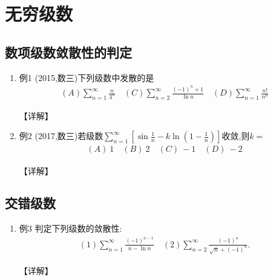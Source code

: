 \documentclass[12pt, a4paper, oneside, UTF8]{ctexbook}
\begin{document}

\else
\fi

\chapter{无穷级数}
\section{数项级数敛散性的判定}

\begin{enumerate}[label=\arabic*.]
    \item 例1 (2015,数三)下列级数中发散的是
    \begin{align*}
        (A)\sum_{n=1}^{\infty}\frac{n}{3^n} \quad (C)\sum_{n=2}^{\infty}\frac{(-1)^n+1}{\ln n} \quad (D)\sum_{n=1}^{\infty}\frac{n!}{n^n}
    \end{align*}
    
    \begin{solution}
    【详解】
    \end{solution}
    
    \item 例2 (2017,数三)若级数$\sum_{n=1}^{\infty}\left[\sin\frac{1}{n}-k\ln\left(1-\frac{1}{n}\right)\right]$收敛,则$k=$
    \begin{align*}
        (A)\ 1 \quad (B)\ 2 \quad (C)\ -1 \quad (D)\ -2
    \end{align*}
    
    \begin{solution}
    【详解】
    \end{solution}
\end{enumerate}

\section{交错级数}

\begin{enumerate}[label=\arabic*.,start=3]
    \item 例3 判定下列级数的敛散性:
    \begin{align*}
        (1)\sum_{n=1}^{\infty}\frac{(-1)^{n-1}}{n-\ln n} \quad (2)\sum_{n=2}^{\infty}\frac{(-1)^n}{\sqrt{n}+(-1)^n}.
    \end{align*}
    
    \begin{solution}
    【详解】
    \end{solution}
\end{enumerate}
\end{document}
